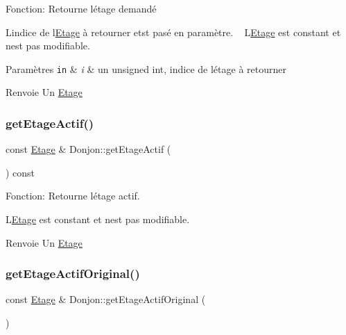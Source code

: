 Fonction\+: Retourne l\textquotesingle{}étage demandé 

L\textquotesingle{}indice de l\textquotesingle{}\mbox{\hyperlink{classEtage}{Etage}} à retourner etst pasé en paramètre. ~\newline
L\textquotesingle{}\mbox{\hyperlink{classEtage}{Etage}} est constant et n\textquotesingle{}est pas modifiable. 
\begin{DoxyParams}[1]{Paramètres}
\mbox{\tt in}  & {\em i} & un unsigned int, indice de l\textquotesingle{}étage à retourner \\
\hline
\end{DoxyParams}
\begin{DoxyReturn}{Renvoie}
Un \mbox{\hyperlink{classEtage}{Etage}} 
\end{DoxyReturn}
\mbox{\label{classDonjon_ac9e5d39d9a46d7dfc4315b6b0041ab17}} 
\subsubsection{\texorpdfstring{get\+Etage\+Actif()}{getEtageActif()}}
{\footnotesize\ttfamily const \mbox{\hyperlink{classEtage}{Etage}} \& Donjon\+::get\+Etage\+Actif (\begin{DoxyParamCaption}{ }\end{DoxyParamCaption}) const}



Fonction\+: Retourne l\textquotesingle{}étage actif. 

L\textquotesingle{}\mbox{\hyperlink{classEtage}{Etage}} est constant et n\textquotesingle{}est pas modifiable. \begin{DoxyReturn}{Renvoie}
Un \mbox{\hyperlink{classEtage}{Etage}} 
\end{DoxyReturn}
\mbox{\label{classDonjon_adaf17f262a479ab2ce8e35ef48f8c157}} 
\subsubsection{\texorpdfstring{get\+Etage\+Actif\+Original()}{getEtageActifOriginal()}}
{\footnotesize\ttfamily const \mbox{\hyperlink{classEtage}{Etage}} \& Donjon\+::get\+Etage\+Actif\+Original (\begin{DoxyParamCaption}{ }\end{DoxyParamCaption})}



